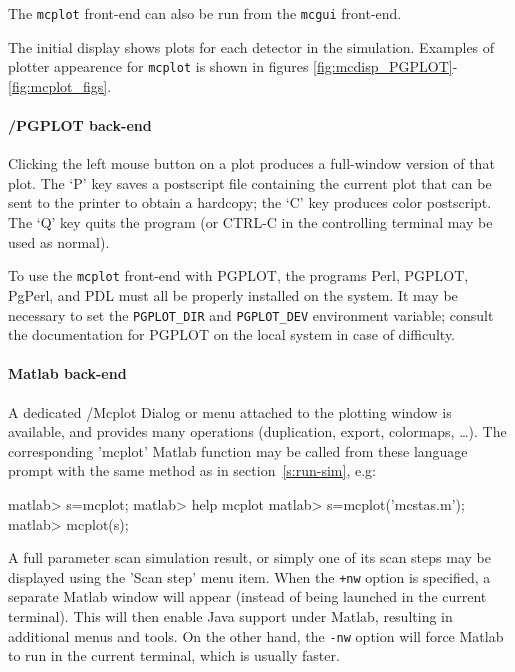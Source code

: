 The \verb+mcplot+ front-end can also be run from the \verb+mcgui+ front-end.

The initial display shows plots for each detector in the simulation.
Examples of plotter appearence for \verb+mcplot+ is shown in figures
 \ref{fig:mcdisp_PGPLOT}-\ref{fig:mcplot_figs}.

\paragraph{\MCS /PGPLOT back-end}
Clicking the left mouse button on a plot produces a full-window version
of that plot. The `P' key saves a postscript file containing the current
plot that can be sent to the printer to obtain a hardcopy; the `C' key
produces color postscript.
The `Q' key quits the program (or CTRL-C in the controlling
terminal may be used as normal).

To use the \verb+mcplot+ front-end with PGPLOT, the programs Perl, PGPLOT,
PgPerl, and PDL must all be properly installed on the system.  It may be
necessary to set the \verb+PGPLOT_DIR+ and \verb+PGPLOT_DEV+ environment
variable; consult the documentation for PGPLOT on the local system in case of
difficulty.

\paragraph{Matlab back-end}

A dedicated \MCS /Mcplot Dialog or menu attached to the plotting window is
available, and provides many operations (duplication, export, colormaps,
\ldots).  The corresponding 'mcplot' Matlab function may be called
from these language prompt with the same method as in section~\ref{s:run-sim},
e.g:
\begin{matlab}
    matlab> s=mcplot;
    matlab> help mcplot
    matlab> s=mcplot('mcstas.m');
    matlab> mcplot(s);
\end{matlab} 

A full parameter scan simulation result, or simply one of its scan steps may be
displayed using the 'Scan step' menu item.  When the \verb|+nw| option is
specified, a separate Matlab window will appear (instead of being
launched in the current terminal). This will then enable Java support under
Matlab, resulting in additional menus and tools. On
the other hand, the \verb|-nw| option will force Matlab to run in the
current terminal, which is usually faster.

